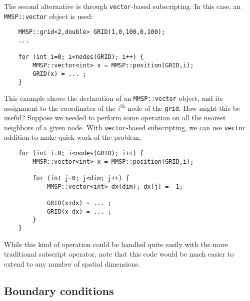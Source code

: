 The second alternative is through {\tt vector}-based subscripting.  In this case, an {\tt MMSP::vector} object is used:
\begin{shadebox}
\begin{verbatim}
    MMSP::grid<2,double> GRID(1,0,100,0,100);
    ...

    for (int i=0; i<nodes(GRID); i++) {
        MMSP::vector<int> x = MMSP::position(GRID,i);
        GRID(x) = ... ;
    }
\end{verbatim}
\end{shadebox}
This example shows the declaration of an {\tt MMSP::vector} object, and its assignment to the coordinates of the $i^\text{th}$ node of the {\tt grid}.  How might this be useful?  Suppose we needed to perform some operation on all the nearest neighbors of a given node.  With {\tt vector}-based subscripting, we can use {\tt vector} addition to make quick work of the problem,
\begin{shadebox}
\begin{verbatim}
    for (int i=0; i<nodes(GRID); i++) {
        MMSP::vector<int> x = MMSP::position(GRID,i);

        for (int j=0; j<dim; j++) {
            MMSP::vector<int> dx(dim); dx[j] =  1;

            GRID(x+dx) = ... ;
            GRID(x-dx) = ... ;
        }
    }
\end{verbatim}
\end{shadebox}
While this kind of operation could be handled quite easily with the more traditional subscript operator, note that this code would be much easier to extend to any number of spatial dimensions.

\subsection{Boundary conditions}



